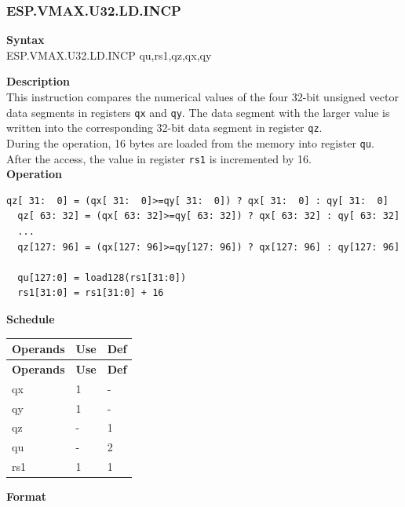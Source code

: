 \newpage
\subsubsection{ESP.VMAX.U32.LD.INCP}\label{instruction:ESPVMAXU32LDINCP}
\textbf{Syntax}\\
ESP.VMAX.U32.LD.INCP qu,rs1,qz,qx,qy

\textbf{Description}\\
This instruction compares the numerical values of the four 32-bit unsigned vector data segments in registers \lstinline{qx} and \lstinline{qy}. The data segment with the larger value is written into the corresponding 32-bit data segment in register \lstinline{qz}.\\During the operation, 16 bytes are loaded from the memory into register \lstinline{qu}. After the access, the value in register \lstinline{rs1} is incremented by 16.\\
\textbf{Operation}
\begin{lstlisting}[escapeinside=`?]
  qz[ 31:  0] = (qx[ 31:  0]>=qy[ 31:  0]) ? qx[ 31:  0] : qy[ 31:  0]
  qz[ 63: 32] = (qx[ 63: 32]>=qy[ 63: 32]) ? qx[ 63: 32] : qy[ 63: 32]
  ...
  qz[127: 96] = (qx[127: 96]>=qy[127: 96]) ? qx[127: 96] : qy[127: 96]

  qu[127:0] = load128(rs1[31:0])
  rs1[31:0] = rs1[31:0] + 16
\end{lstlisting}


\textbf{Schedule}\\
\begin{longtable}[c]{|l|l|l|}
    \hline
    \rowcolor{lightgray}
    \textbf{Operands} & \textbf{Use} & \textbf{Def} \\\hline
    \endfirsthead
    \hline
    \rowcolor{lightgray}
     \textbf{Operands} & \textbf{Use} & \textbf{Def} \\\hline
    \endhead
    \hline
    \endfoot

    qx & 1 & - \\\hline
  qy & 1 & - \\\hline
     qz & - & 1 \\\hline
     qu & - & 2 \\\hline
     rs1 & 1 & 1

\end{longtable}

\textbf{Format}\\

